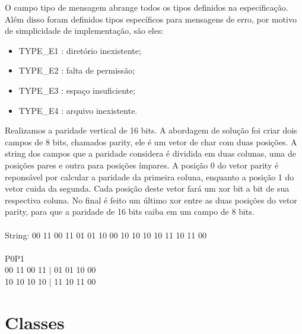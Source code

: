 \documentclass[a4paper,10pt]{coursepaper}
\begin{document}
O campo tipo de mensagem abrange todos os tipos definidos na especificação. Além disso foram definidos tipos específicos para mensagens de erro, por motivo de simplicidade de implementação, são eles:
\begin{itemize}
 \item TYPE\_E1 : diretório inexistente;
 \item TYPE\_E2 : falta de permissão;
 \item TYPE\_E3 : espaço insuficiente;
 \item TYPE\_E4 : arquivo inexistente.
\end{itemize}

Realizamos a paridade vertical de 16 bits. A abordagem de solução foi criar dois campos de 8 bits, chamados parity, ele é um vetor de char com duas posições. A string dos campos que a paridade considera é dividida em duas colunas, uma de posições pares e outra para posições ímpares. A posição 0 do vetor parity é reponsável por calcular a paridade da primeira coluna, enquanto a posição 1 do vetor cuida da segunda. Cada posição deste vetor fará um xor bit a bit de sua respectiva coluna. No final é feito um último xor entre as duas posições do vetor parity, para que a paridade de 16 bits caiba em um campo de 8 bits.\\ \\
  String: 00 11 00 11 01 01 10 00 10 10 10 10 11 10 11 00 \\
  \\             
  P0\quad\quad\quad\quad\quad\quad P1 \\
  00 11 00 11 $|$ 01 01 10 00 \\
  10 10 10 10 $|$ 11 10 11 00 \\


\section{Classes}
\end{document}
